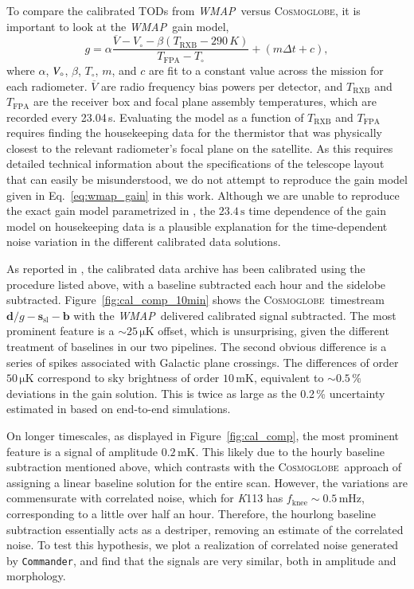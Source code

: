 \documentclass[twocolumn]{../../common/aa}
\def\WMAP{\emph{WMAP}}
\def\commander{\texttt{Commander}}
\newcommand{\cosmoglobe}{\textsc{Cosmoglobe}}
\newcommand{\K}[0]{\textit K}
\newcommand{\V}[0]{\textit V}
\begin{document}
To compare the calibrated TODs from \WMAP\ versus \cosmoglobe, it is  important to look at the \WMAP\ gain model,
\begin{equation}
	\label{eq:wmap_gain}
	g=\alpha\frac{\overline V-V_\circ-\beta(T_\mathrm{RXB}-290\,K)}
	{T_\mathrm{FPA}-T_\circ}+(m\Delta t+c),
\end{equation}
where $\alpha$, $\V_\circ$, $\beta$, $T_\circ$, $m$, and $c$ are fit to a constant value across the mission for each radiometer. $\overline V$ are radio frequency bias powers per detector, and $T_\mathrm{RXB}$ and $T_\mathrm{FPA}$ are the receiver box and focal plane assembly temperatures, which are recorded every 23.04\,s. 
Evaluating the model as a function of $T_\mathrm{RXB}$ and $T_\mathrm{FPA}$ requires finding the housekeeping data for the thermistor that was physically closest to the relevant radiometer's focal plane on the satellite. As this requires detailed technical information about the specifications of the telescope layout that can easily be misunderstood, we do not attempt to reproduce the gain model given in Eq.~\eqref{eq:wmap_gain} in this work.
Although we are unable to reproduce the exact gain model parametrized in \citet{wmapexsupp}, the $23.4\,\mathrm s$ time dependence of the gain model on housekeeping data is a plausible explanation for the time-dependent noise variation in the different calibrated data solutions.

As reported in \citet{hinshaw2007}, the calibrated data archive has been calibrated using the procedure listed above, with a baseline subtracted each hour and the sidelobe subtracted. Figure~\ref{fig:cal_comp_10min} shows the \cosmoglobe\ timestream $\boldsymbol d/g-\boldsymbol s_\mathrm{sl}-\boldsymbol b$ with the \WMAP\ delivered calibrated signal subtracted. The most prominent feature is a $\sim25\,\mathrm{\mu K}$ offset, which is unsurprising, given the different treatment of baselines in our two pipelines. The second obvious difference is a series of spikes associated with Galactic plane crossings. The differences of order $50\,\mathrm{\mu K}$ correspond to sky brightness of order $10\,\mathrm{mK}$, equivalent to $\sim0.5\,\%$ deviations in the gain solution. This is twice as large as the 0.2\,\% uncertainty estimated in \citet{bennett2012} based on end-to-end simulations.

On longer timescales, as displayed in Figure~\ref{fig:cal_comp}, the most prominent feature is a signal of amplitude $0.2\,\mathrm{mK}$. This likely due to the hourly baseline subtraction mentioned above, which contrasts with the \cosmoglobe\ approach of assigning a linear baseline solution for the entire scan. However, the variations are commensurate with correlated noise, which for \K113 has $f_\mathrm{knee}\sim0.5\,\mathrm{mHz}$, corresponding to a little over half an hour. Therefore, the hourlong baseline subtraction essentially acts as a destriper, removing an estimate of the correlated noise. To test this hypothesis, we plot a realization of correlated noise generated by \commander, and find that the signals are very similar, both in amplitude and morphology.
\end{document}
